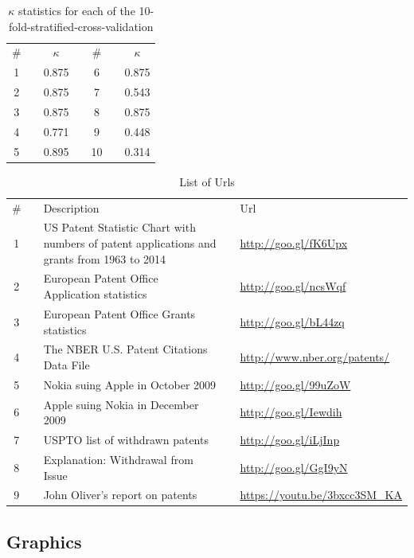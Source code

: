 \documentclass[12pt, a4paper]{scrartcl}
\newcommand{\ra}[1]{\renewcommand{\arraystretch}{#1}}
\theoremstyle{definition}
\begin{document}
\begin{table}[!hp]\caption{$\kappa$ statistics for each of the 10-fold-stratified-cross-validation}\label{tab:kappastatistics}\centering\ra{1.3}
\begin{tabular}{cp{1mm}cp{1cm}cp{1mm}c} \toprule
\# & & $\kappa$ & & \# & & $\kappa$\\ \cline{1-1} \cline{3-3} \cline{5-5} \cline{7-7}
1 & & 0.875 & & 6 & & 0.875 \\
2 & & 0.875 & & 7 & & 0.543 \\
3 & & 0.875 & & 8 & & 0.875 \\
4 & & 0.771 & & 9 & & 0.448 \\
5 & & 0.895 & & 10 & & 0.314 \\
\bottomrule
\end{tabular}
\end{table}

\begin{table}[!hp]\caption{List of Urls}\label{tab:url}\centering\ra{1.3}
\begin{tabular}{cp{0.5cm}p{5cm}p{0.5cm}p{5cm}}\toprule
\# & & Description & & Url\\ \cline{1-1} \cline{3-3} \cline{5-5}
1 & & US Patent Statistic Chart with numbers of patent applications and grants from 1963 to 2014 & & \url{http://goo.gl/fK6Upx}\\
2 & & European Patent Office Application statistics & & \url{http://goo.gl/ncsWqf}\\
3 & & European Patent Office Grants statistics & & \url{http://goo.gl/bL44zq}\\
4 & & The NBER U.S. Patent Citations Data File & & \url{http://www.nber.org/patents/}\\
5 & & Nokia suing Apple in October 2009 & & \url{http://goo.gl/99uZoW}\\
6 & & Apple suing Nokia in December 2009 & & \url{http://goo.gl/Iewdih}\\
7 & & USPTO list of withdrawn patents & & \url{http://goo.gl/iLjInp}\\
8 & & Explanation: Withdrawal from Issue & & \url{http://goo.gl/GgI9yN}\\
9 & & John Oliver's report on patents & & \url{https://youtu.be/3bxcc3SM_KA}\\
\bottomrule
\end{tabular}
\end{table}




\newpage

\subsection{Graphics}
\end{document}
